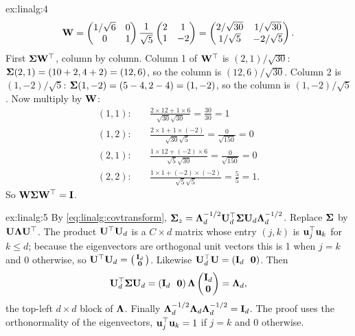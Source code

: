 \begin{solution}{ex:linalg:4}
\[
\mathbf{W} = \begin{pmatrix} 1/\sqrt6 & 0\\ 0 & 1\end{pmatrix}\frac{1}{\sqrt5}
\begin{pmatrix} 2 & 1\\ 1 & -2\end{pmatrix}
= \begin{pmatrix} 2/\sqrt{30} & 1/\sqrt{30}\\ 1/\sqrt5 & -2/\sqrt5\end{pmatrix}.
\]
First $\boldsymbol{\Sigma}\mathbf{W}^{\top}$, column by column. Column 1 of $\mathbf{W}^{\top}$ is $(2, 1)/\sqrt{30}$:
$\boldsymbol{\Sigma}(2, 1) = (10 + 2, 4 + 2) = (12, 6)$, so the column is $(12, 6)/\sqrt{30}$. Column 2 is
$(1, -2)/\sqrt5$: $\boldsymbol{\Sigma}(1, -2) = (5 - 4, 2 - 4) = (1, -2)$, so the column is $(1, -2)/\sqrt5$.
Now multiply by $\mathbf{W}$:
\begin{align*}
(1,1):&\quad \frac{2\times12 + 1\times6}{\sqrt{30}\sqrt{30}} = \frac{30}{30} = 1\\
(1,2):&\quad \frac{2\times1 + 1\times(-2)}{\sqrt{30}\sqrt5} = \frac{0}{\sqrt{150}} = 0\\
(2,1):&\quad \frac{1\times12 + (-2)\times6}{\sqrt5\sqrt{30}} = \frac{0}{\sqrt{150}} = 0\\
(2,2):&\quad \frac{1\times1 + (-2)\times(-2)}{\sqrt5\sqrt5} = \frac{5}{5} = 1 .
\end{align*}
So $\mathbf{W}\boldsymbol{\Sigma}\mathbf{W}^{\top} = \mathbf{I}$.
\end{solution}

\begin{solution}{ex:linalg:5}
By \cref{eq:linalg:covtransform}, $\boldsymbol{\Sigma}_z = \mathbf{\Lambda}_d^{-1/2}\mathbf{U}_d^{\top}\boldsymbol{\Sigma}\mathbf{U}_d
\mathbf{\Lambda}_d^{-1/2}$. Replace $\boldsymbol{\Sigma}$ by $\mathbf{U}\mathbf{\Lambda}\mathbf{U}^{\top}$. The product
$\mathbf{U}^{\top}\mathbf{U}_d$ is a $C\times d$ matrix whose entry $(j,k)$ is $\mathbf{u}_j^{\top}\mathbf{u}_k$ for
$k \le d$; because the eigenvectors are orthogonal unit vectors this is 1 when $j = k$ and 0
otherwise, so $\mathbf{U}^{\top}\mathbf{U}_d = \begin{psmallmatrix}\mathbf{I}_d\\ \mathbf{0}\end{psmallmatrix}$.
Likewise $\mat{U}_d\T\mat{U} = (\mat{I}_d\ \ \mat{0})$. Then
\[
\mat{U}_d\T\Cov\mat{U}_d = (\mat{I}_d\ \ \mat{0})\,\mat{\Lambda}
\begin{pmatrix}\mat{I}_d\\ \mat{0}\end{pmatrix} = \mat{\Lambda}_d,
\]
the top-left $d\times d$ block of $\mathbf{\Lambda}$. Finally
$\mathbf{\Lambda}_d^{-1/2}\mathbf{\Lambda}_d\mathbf{\Lambda}_d^{-1/2} = \mathbf{I}_d$. The proof uses the
orthonormality of the eigenvectors, $\mathbf{u}_j^{\top}\mathbf{u}_k = 1$ if $j = k$ and 0 otherwise.
\end{solution}

